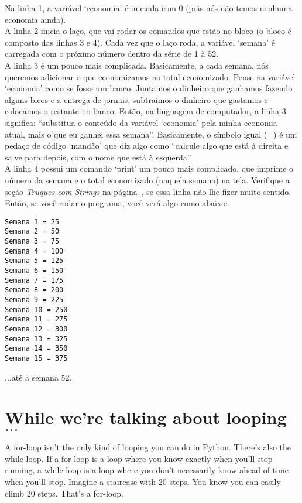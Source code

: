 Na linha 1, a variável `economia' é iniciada com 0 (pois nós não temos nenhuma economia ainda).\\
A linha 2 inicia o laço, que vai rodar os comandos que estão no bloco (o bloco é composto das linhas 3 e 4). Cada vez que o laço roda, a variável `semana' é carregada com o próximo número dentro da série de 1 à 52.\\
A linha 3 é um pouco mais complicada. Basicamente, a cada semana, nós queremos adicionar o que economizamos ao total economizado. Pense na variável `economia' como se fosse um banco. Juntamos o dinheiro que ganhamos fazendo alguns bicos e a entrega de jornais, subtraimos o dinheiro que gastamos e colocamos o restante no banco. Então, na linguagem de computador, a linha 3 significa: ``substitua o conteúdo da variável `economia' pela minha economia atual, mais o que eu ganhei essa semana''. Basicamente, o símbolo igual (=) é um pedaço de código `mandão' que diz algo como ``calcule algo que está à direita e salve para depois, com o nome que está à esquerda''.\\
A linha 4 possui um comando `print' um pouco mais complicado, que imprime o número da semana e o total economizado (naquela semana) na tela. Verifique a seção \emph{Truques com Strings} na página~\pageref{trickswithstrings}, se essa linha não lhe fizer muito sentido. Então, se você rodar o programa, você verá algo como abaixo:

\begin{listing}
\begin{verbatim}
Semana 1 = 25
Semana 2 = 50
Semana 3 = 75
Semana 4 = 100
Semana 5 = 125
Semana 6 = 150
Semana 7 = 175
Semana 8 = 200
Semana 9 = 225
Semana 10 = 250
Semana 11 = 275
Semana 12 = 300
Semana 13 = 325
Semana 14 = 350
Semana 15 = 375
\end{verbatim}
\end{listing}

$\ldots$até a semana 52.

\section{While we're talking about looping$\ldots$}

A for-loop isn't the only kind of looping you can do in Python. There's also the while-loop. If a for-loop is a loop where you know exactly when you'll stop running, a while-loop is a loop where you don't necessarily know ahead of time when you'll stop. Imagine a staircase with 20 steps.  You know you can easily climb 20 steps.  That's a for-loop.

